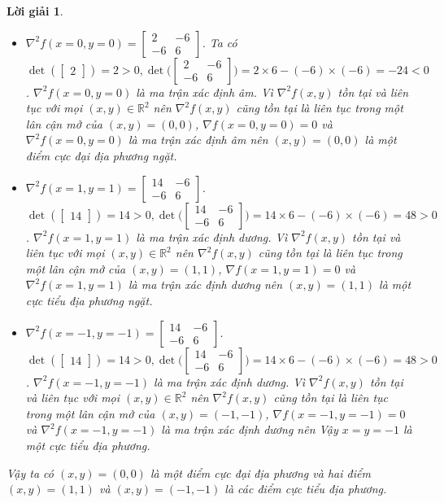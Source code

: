 \documentclass[14pt, a4paper]{article}
\theoremstyle{sltheorem}
\theoremstyle{soltheorem}
\newtheorem*{loigiai}{Lời giải}
\begin{document}
\begin{loigiai}
        \begin{itemize}
            \item $\nabla^2 f(x=0,y=0)=\begin{bmatrix} 2 & -6 \\ -6 & 6 \end{bmatrix}$. Ta có $\det(\begin{bmatrix}2\end{bmatrix})=2>0, \det{\Big(\begin{bmatrix} 2 & -6 \\ -6 & 6 \end{bmatrix}\Big)}=2\times6 - (-6)\times(-6)=-24<0$. $\nabla^2 f(x=0,y=0)$ là ma trận xác định âm. 
            Vì $\nabla^2 f(x, y)$ tồn tại và liên tục với mọi $(x, y) \in \mathbb{R}^2$ nên $\nabla^2 f(x, y)$ cũng tồn tại là liên tục trong một lân cận mở của $(x,y)=(0,0)$, $\nabla f(x=0,y=0)=0$ và $\nabla^2 f(x=0, y=0)$ là ma trận xác định âm nên $(x,y)=(0,0)$ là một điểm cực đại địa phương ngặt.
            \item $\nabla^2 f(x=1,y=1)=\begin{bmatrix} 14 & -6 \\ -6 & 6 \end{bmatrix}$. $\det{(\begin{bmatrix}14\end{bmatrix})}=14>0, \det{\Big(\begin{bmatrix} 14 & -6 \\ -6 & 6 \end{bmatrix}\Big)}=14\times6 - (-6)\times(-6)=48>0$.
            $\nabla^2 f(x=1,y=1)$ là ma trận xác định dương.
            Vì $\nabla^2 f(x, y)$ tồn tại và liên tục với mọi $(x, y) \in \mathbb{R}^2$ nên $\nabla^2 f(x, y)$ cũng tồn tại là liên tục trong một lân cận mở của $(x,y)=(1,1)$, $\nabla f(x=1,y=1)=0$ và $\nabla^2 f(x=1,y=1)$ là ma trận xác định dương nên $(x,y)=(1,1)$ là một cực tiểu địa phương ngặt.
            \item $\nabla^2 f(x=-1,y=-1)=\begin{bmatrix} 14 & -6 \\ -6 & 6 \end{bmatrix}$. $\det{(\begin{bmatrix}14\end{bmatrix})}=14>0, \det{\Big(\begin{bmatrix} 14 & -6 \\ -6 & 6 \end{bmatrix}\Big)}=14\times6 - (-6)\times(-6)=48>0$.
            $\nabla^2 f(x=-1,y=-1)$ là ma trận xác định dương.
            Vì $\nabla^2 f(x, y)$ tồn tại và liên tục với mọi $(x, y) \in \mathbb{R}^2$ nên $\nabla^2 f(x, y)$ cũng tồn tại là liên tục trong một lân cận mở của $(x,y)=(-1,-1)$, $\nabla f(x=-1,y=-1)=0$ và $\nabla^2 f(x=-1,y=-1)$ là ma trận xác định dương nên Vậy $x=y=-1$ là một cực tiểu địa phương.
        \end{itemize}
        Vậy ta có $(x,y)=(0,0)$ là một điểm cực đại địa phương và hai điểm $(x,y)=(1, 1)$ và $(x,y)=(-1,-1)$ là các điểm cực tiểu địa phương.
    \end{loigiai}
\end{document}
